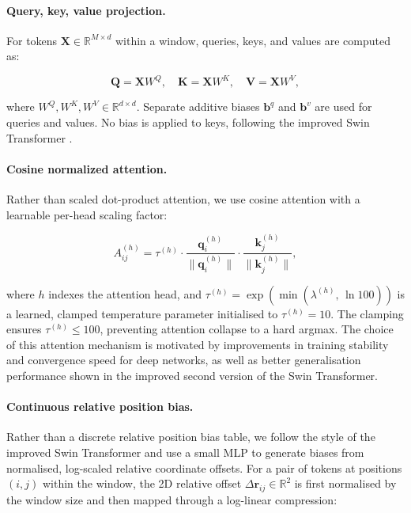 \paragraph{Query, key, value projection.}
For tokens $\mathbf{X} \in \mathbb{R}^{M \times d}$ within a window, queries, keys, and values are computed as:

\begin{equation}
    \mathbf{Q} = \mathbf{X} W^Q, \quad
    \mathbf{K} = \mathbf{X} W^K, \quad
    \mathbf{V} = \mathbf{X} W^V,
\end{equation}

where $W^Q, W^K, W^V \in \mathbb{R}^{d \times d}$. Separate additive biases $\mathbf{b}^q$ and $\mathbf{b}^v$ are used for queries and values. No bias is applied to keys, following the improved Swin Transformer \cite{liu2021swin}.

\paragraph{Cosine normalized attention.}
Rather than scaled dot-product attention, we use cosine attention with a learnable per-head scaling factor:

\begin{equation}
    A_{ij}^{(h)} = \tau^{(h)} \cdot \frac{\mathbf{q}_i^{(h)}}{\|\mathbf{q}_i^{(h)}\|} \cdot \frac{\mathbf{k}_j^{(h)}}{\|\mathbf{k}_j^{(h)}\|},
\end{equation}

where $h$ indexes the attention head, and $\tau^{(h)} = \exp\!\left(\min\!\left(\lambda^{(h)},\, \ln 100\right)\right)$ is a learned, clamped temperature parameter initialised to $\tau^{(h)} = 10$. The clamping ensures $\tau^{(h)} \leq 100$, preventing attention collapse to a hard argmax. The choice of this attention mechanism is motivated by improvements in training stability and convergence speed for deep networks, as well as better generalisation performance shown in the improved second version of the Swin Transformer. \cite{Liu2021SwinV2}  \cite{LuoCosineNormalization2017}

\paragraph{Continuous relative position bias.}
Rather than a discrete relative position bias table, we follow the style of the improved Swin Transformer and use a small MLP to generate biases from normalised, log-scaled relative coordinate offsets. For a pair of tokens at positions $(i, j)$ within the window, the 2D relative offset $\Delta\mathbf{r}_{ij} \in \mathbb{R}^2$ is first normalised by the window size and then mapped through a log-linear compression:

